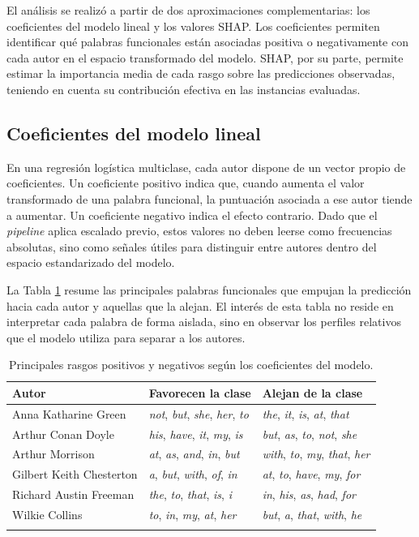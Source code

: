 \documentclass[IB]{TFUOC}%
\begin{document}
El análisis se realizó a partir de dos aproximaciones complementarias: los coeficientes del modelo lineal y los valores SHAP. Los coeficientes permiten identificar qué palabras funcionales están asociadas positiva o negativamente con cada autor en el espacio transformado del modelo. SHAP, por su parte, permite estimar la importancia media de cada rasgo sobre las predicciones observadas, teniendo en cuenta su contribución efectiva en las instancias evaluadas.

\subsection{Coeficientes del modelo lineal}

En una regresión logística multiclase, cada autor dispone de un vector propio de coeficientes. Un coeficiente positivo indica que, cuando aumenta el valor transformado de una palabra funcional, la puntuación asociada a ese autor tiende a aumentar. Un coeficiente negativo indica el efecto contrario. Dado que el \textit{pipeline} aplica escalado previo, estos valores no deben leerse como frecuencias absolutas, sino como señales útiles para distinguir entre autores dentro del espacio estandarizado del modelo.

La Tabla \ref{tab:coeficientes-globales-autores} resume las principales palabras funcionales que empujan la predicción hacia cada autor y aquellas que la alejan. El interés de esta tabla no reside en interpretar cada palabra de forma aislada, sino en observar los perfiles relativos que el modelo utiliza para separar a los autores.

\begin{longtable}{|p{4.5cm}|p{4.5cm}|p{4.5cm}|}
\hline
\textbf{Autor} & \textbf{Favorecen la clase} & \textbf{Alejan de la clase} \\
\hline
Anna Katharine Green &
\textit{not}, \textit{but}, \textit{she}, \textit{her}, \textit{to} &
\textit{the}, \textit{it}, \textit{is}, \textit{at}, \textit{that} \\
\hline
Arthur Conan Doyle &
\textit{his}, \textit{have}, \textit{it}, \textit{my}, \textit{is} &
\textit{but}, \textit{as}, \textit{to}, \textit{not}, \textit{she} \\
\hline
Arthur Morrison &
\textit{at}, \textit{as}, \textit{and}, \textit{in}, \textit{but} &
\textit{with}, \textit{to}, \textit{my}, \textit{that}, \textit{her} \\
\hline
Gilbert Keith Chesterton &
\textit{a}, \textit{but}, \textit{with}, \textit{of}, \textit{in} &
\textit{at}, \textit{to}, \textit{have}, \textit{my}, \textit{for} \\
\hline
Richard Austin Freeman &
\textit{the}, \textit{to}, \textit{that}, \textit{is}, \textit{i} &
\textit{in}, \textit{his}, \textit{as}, \textit{had}, \textit{for} \\
\hline
Wilkie Collins &
\textit{to}, \textit{in}, \textit{my}, \textit{at}, \textit{her} &
\textit{but}, \textit{a}, \textit{that}, \textit{with}, \textit{he} \\
\hline
\caption{Principales rasgos positivos y negativos según los coeficientes del modelo.}
\label{tab:coeficientes-globales-autores}
\end{longtable}
\end{document}
